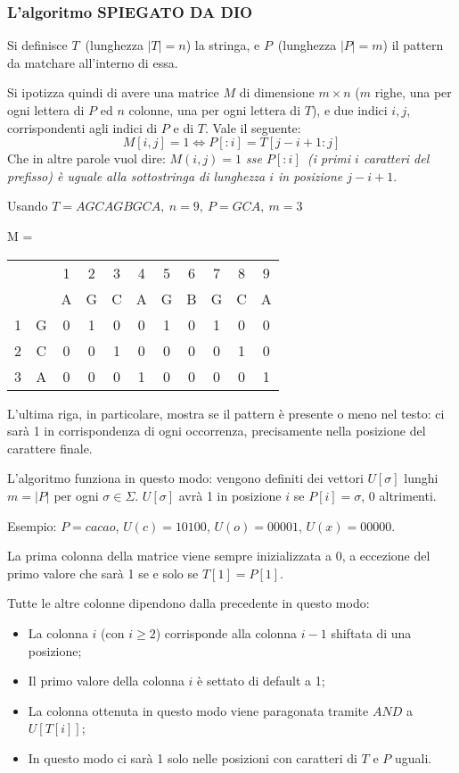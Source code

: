 \subsubsection{L'algoritmo SPIEGATO DA DIO}
Si definisce $T$\ (lunghezza $\left|T\right| = n$) la stringa, e $P$\ (lunghezza $\left|P\right| = m$) il pattern da matchare all'interno di essa. \par
Si ipotizza quindi di avere una matrice $M$ di dimensione $m \times n$ ($m$ righe, una per ogni lettera di $P$ ed $n$ colonne, una per ogni lettera di $T$), e due indici $i, j$, corrispondenti agli indici di $P$ e di $T$. Vale il seguente:
$$M[i, j] = 1 \Leftrightarrow P[:i] = T[j - i + 1 : j]$$
Che in altre parole vuol dire: \textit{$M(i, j) = 1$ sse $P[:i]$\ (i primi $i$ caratteri del prefisso) è uguale alla sottostringa di lunghezza $i$ in posizione $j - i + 1$}.
\begin{example}{}{}
   Usando $T = AGCAGBGCA,\ n = 9,\ P = GCA,\ m = 3$ \\
    \begin{center}
    M = \begin{tabular}{l c | *{9}{c} }
        ~ & ~ & 1 & 2 & 3 & 4 & 5 & 6 & 7 & 8 & 9 \\
        ~ & ~ & A & G & C & A & G & B & G & C & A \\
        \hline
        1 & G & 0 & 1 & 0 & 0 & 1 & 0 & 1 & 0 & 0 \\
        2 & C & 0 & 0 & 1 & 0 & 0 & 0 & 0 & 1 & 0 \\
        3 & A & 0 & 0 & 0 & 1 & 0 & 0 & 0 & 0 & 1
    \end{tabular}
    \end{center}
\end{example}

L'ultima riga, in particolare, mostra se il pattern è presente o meno nel testo: ci sarà 1 in corrispondenza di ogni occorrenza, precisamente nella posizione del carattere finale.

L'algoritmo funziona in questo modo: vengono definiti dei vettori $U[\sigma]$ lunghi $m = |P|$ per ogni $\sigma \in \Sigma$. $U[\sigma]$ avrà 1 in posizione $i$ se $P[i] = \sigma$, 0 altrimenti.

Esempio: $P = cacao$, $U(c) = 10100$, $U(o) = 00001$, $U(x) = 00000$.

La prima colonna della matrice viene sempre inizializzata a 0, a eccezione del primo valore che sarà 1 se e solo se $T[1] = P[1]$.

Tutte le altre colonne dipendono dalla precedente in questo modo:
\begin{itemize}
	\item La colonna $i$ (con $i \geq 2$) corrisponde alla colonna $i-1$ shiftata di una posizione;
	\item Il primo valore della colonna $i$ è settato di default a 1;
	\item La colonna ottenuta in questo modo viene paragonata tramite $AND$ a $U[T[i]]$;
	\item In questo modo ci sarà 1 solo nelle posizioni con caratteri di $T$ e $P$ uguali.
\end{itemize}

